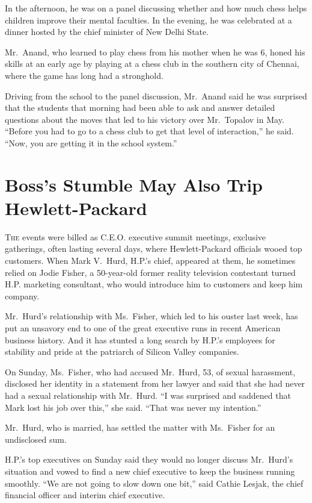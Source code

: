 ﻿\documentclass[12pt]{article}
\begin{document}
In the afternoon, he was on a panel discussing whether and how much chess helps children improve
their mental faculties. In the evening, he was celebrated at a dinner hosted by the chief minister
of New Delhi State.

Mr.~Anand, who learned to play chess from his mother when he was 6, honed his skills at an early age
by playing at a chess club in the southern city of Chennai, where the game has long had a
stronghold.

Driving from the school to the panel discussion, Mr.~Anand said he was surprised that the students
that morning had been able to ask and answer detailed questions about the moves that led to his
victory over Mr.~Topalov in May. ``Before you had to go to a chess club to get that level of
interaction,'' he said. ``Now, you are getting it in the school system.''

\section{Boss's Stumble May Also Trip Hewlett-Packard}

\lettrine{T}{he} events were billed as C.E.O. executive summit meetings,
exclusive gatherings, often lasting several days, where Hewlett-Packard officials wooed top
customers. When Mark V.~Hurd, H.P.'s chief, appeared at them, he sometimes relied on Jodie Fisher, a
50-year-old former reality television contestant turned H.P. marketing consultant, who would
introduce him to customers and keep him company.

Mr.~Hurd's relationship with Ms.~Fisher, which led to his ouster last week, has put an unsavory end
to one of the great executive runs in recent American business history. And it has stunted a long
search by H.P.'s employees for stability and pride at the patriarch of Silicon Valley companies.

On Sunday, Ms.~Fisher, who had accused Mr.~Hurd, 53, of sexual harassment, disclosed her identity in
a statement from her lawyer and said that she had never had a sexual relationship with Mr.~Hurd. ``I
was surprised and saddened that Mark lost his job over this,'' she said. ``That was never my
intention.''

Mr.~Hurd, who is married, has settled the matter with Ms.~Fisher for an undisclosed sum.

H.P.'s top executives on Sunday said they would no longer discuss Mr.~Hurd's situation and vowed to
find a new chief executive to keep the business running smoothly. ``We are not going to slow down
one bit,'' said Cathie Lesjak, the chief financial officer and interim chief executive.
\end{document}
